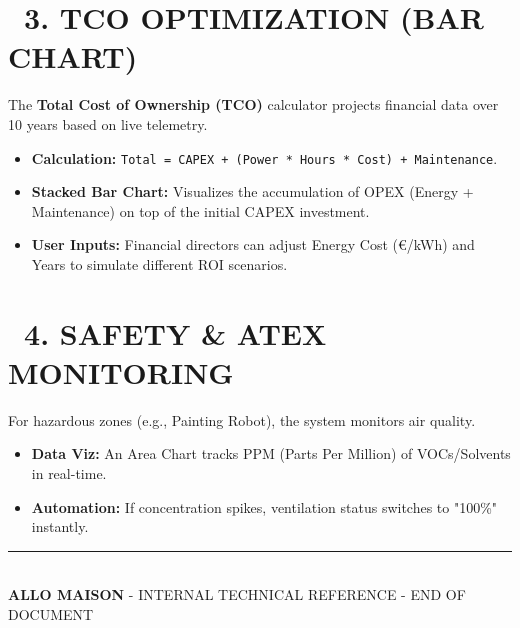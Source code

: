 \documentclass[11pt,a4paper]{article}
\begin{document}
\section*{\faCalculator\ 3. TCO OPTIMIZATION (BAR CHART)}
The \textbf{Total Cost of Ownership (TCO)} calculator projects financial data over 10 years based on live telemetry.
\begin{itemize}
    \item \textbf{Calculation:} \texttt{Total = CAPEX + (Power * Hours * Cost) + Maintenance}.
    \item \textbf{Stacked Bar Chart:} Visualizes the accumulation of OPEX (Energy + Maintenance) on top of the initial CAPEX investment.
    \item \textbf{User Inputs:} Financial directors can adjust Energy Cost (€/kWh) and Years to simulate different ROI scenarios.
\end{itemize}

\vspace{0.5cm}

\section*{\faShieldAlt\ 4. SAFETY \& ATEX MONITORING}
For hazardous zones (e.g., Painting Robot), the system monitors air quality.
\begin{itemize}
    \item \textbf{Data Viz:} An Area Chart tracks PPM (Parts Per Million) of VOCs/Solvents in real-time.
    \item \textbf{Automation:} If concentration spikes, ventilation status switches to "100\%" instantly.
\end{itemize}

\vfill
\begin{center}
    \rule{\textwidth}{0.5pt}\\
    \vspace{0.2cm}
    \textbf{ALLO MAISON} - INTERNAL TECHNICAL REFERENCE - END OF DOCUMENT
\end{center}
\end{document}
